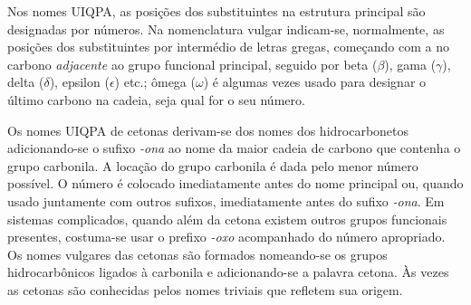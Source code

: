 Nos nomes UIQPA, as posições dos substituintes na estrutura principal são designadas por números. Na nomenclatura vulgar indicam-se, normalmente, as posições dos substituintes por intermédio de letras gregas, começando com a no carbono \textit{adjacente} ao grupo funcional principal, seguido por beta ($\beta$), gama ($\gamma$), delta ($\delta$), epsilon ($\epsilon$) etc.; ômega ($\omega$) é algumas vezes usado para designar o último carbono na cadeia, seja qual for o seu número.

\begin{tightcenter}
    \chemnameinit{}
    \qquad
\end{tightcenter}

Os nomes UIQPA de cetonas derivam-se dos nomes dos hidrocarbonetos adicionando-se o sufixo \textit{-ona} ao nome da maior cadeia de carbono que contenha o grupo carbonila. A locação do grupo carbonila é dada pelo menor número possível. O número é colocado imediatamente antes do nome principal ou, quando usado juntamente com outros sufixos, imediatamente antes do sufixo \textit{-ona}. Em sistemas complicados, quando além da cetona existem outros grupos funcionais presentes, costuma-se usar o prefixo \textit{-oxo} acompanhado do número apropriado. Os nomes vulgares das cetonas são formados nomeando-se os grupos hidrocarbônicos ligados à carbonila e adicionando-se a palavra cetona. Às vezes as cetonas são conhecidas pelos nomes triviais que refletem sua origem.

\begin{tightcenter}
    \chemnameinit{}
    \qquad
    \qquad
    \qquad
    \chemnameinit{}
    \qquad
    \qquad
\end{tightcenter}

